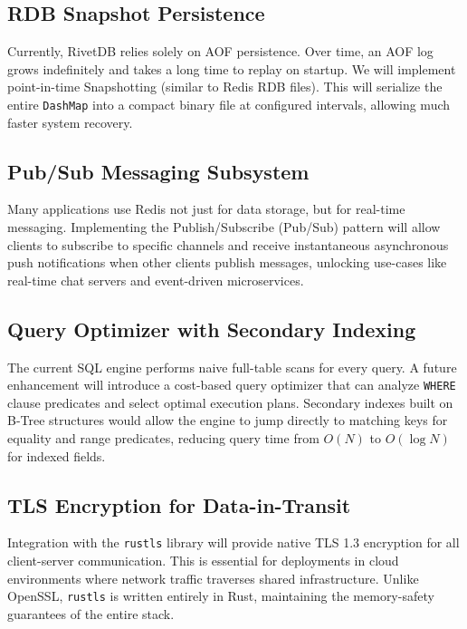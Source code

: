 \subsection{RDB Snapshot Persistence}
Currently, RivetDB relies solely on AOF persistence. Over time, an AOF log grows indefinitely and takes a long time to replay on startup. We will implement point-in-time Snapshotting (similar to Redis RDB files). This will serialize the entire \texttt{DashMap} into a compact binary file at configured intervals, allowing much faster system recovery.

\subsection{Pub/Sub Messaging Subsystem}
Many applications use Redis not just for data storage, but for real-time messaging. Implementing the Publish/Subscribe (Pub/Sub) pattern will allow clients to subscribe to specific channels and receive instantaneous asynchronous push notifications when other clients publish messages, unlocking use-cases like real-time chat servers and event-driven microservices.

\subsection{Query Optimizer with Secondary Indexing}
The current SQL engine performs naive full-table scans for every query. A future enhancement will introduce a cost-based query optimizer that can analyze \texttt{WHERE} clause predicates and select optimal execution plans. Secondary indexes built on B-Tree structures would allow the engine to jump directly to matching keys for equality and range predicates, reducing query time from $O(N)$ to $O(\log N)$ for indexed fields.

\subsection{TLS Encryption for Data-in-Transit}
Integration with the \texttt{rustls} library will provide native TLS 1.3 encryption for all client-server communication. This is essential for deployments in cloud environments where network traffic traverses shared infrastructure. Unlike OpenSSL, \texttt{rustls} is written entirely in Rust, maintaining the memory-safety guarantees of the entire stack.

